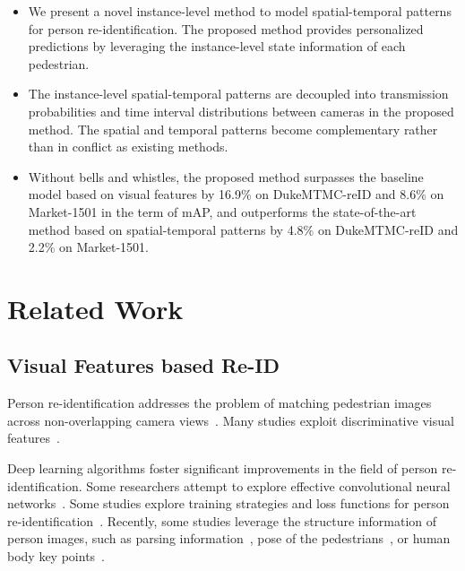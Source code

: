 \documentclass[10pt,twocolumn,letterpaper]{article}
\begin{document}
\begin{itemize}

\item We present a novel instance-level method to model spatial-temporal patterns for person re-identification. The proposed method provides personalized predictions by leveraging the instance-level state information of each pedestrian.

\item The instance-level spatial-temporal patterns are decoupled into transmission probabilities and time interval distributions between cameras in the proposed method. The spatial and temporal patterns become complementary rather than in conflict as existing methods.

\item Without bells and whistles, the proposed method surpasses the baseline model based on visual features by 16.9\% on DukeMTMC-reID and 8.6\% on Market-1501 in the term of mAP, and outperforms the state-of-the-art method based on spatial-temporal patterns by 4.8\% on DukeMTMC-reID and 2.2\% on Market-1501.

\end{itemize}






\section{Related Work}
\label{sec:related_work}








\subsection{Visual Features based Re-ID}


Person re-identification addresses the problem of matching pedestrian images across non-overlapping camera views~\cite{Gong2014Person}. Many studies exploit discriminative visual features~\cite{Apurva2011Multiple, Ma2018Covariance, Yang2014Salient}. 


Deep learning algorithms foster significant improvements in the field of person re-identification.
Some researchers attempt to explore effective convolutional neural networks~\cite{Hermans2017In, 2015An, Wang2017P2SNet, Wang2016DARI, Shen2018PersonRW, Ding2015Deep, Lin2017Deep, Chen2020Salience, Zhang2020Relation, Zheng2018Person}. 
Some studies explore training strategies and loss functions for person re-identification~\cite{Hermans2017In, Wang2017P2SNet, Wang2016DARI, Ding2015Deep}. 
Recently, some studies leverage the structure information of person images, such as parsing information~\cite{Song2018Mask, 2020Foreground, 2018MaskReID, Kalayeh2018Human}, pose of the pedestrians~\cite{Su2017Learning, 2019Pose, 2018Pose}, or human body key points~\cite{Wang2020High}.
\end{document}
